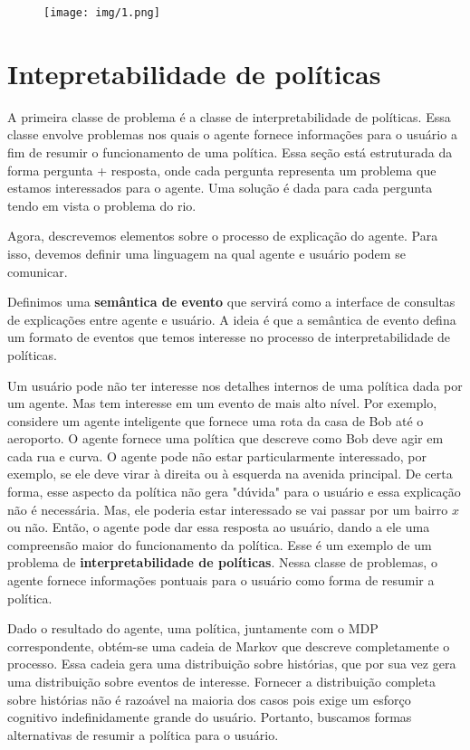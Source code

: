 \documentclass{article}
\begin{document}
\begin{figure}[h]
  \begin{center}
    \texttt{[image: img/1.png]}
  \end{center}
  \caption{}
  \label{fig:}
\end{figure}


\section{Intepretabilidade de políticas}
A primeira classe de problema é a classe de interpretabilidade de políticas. Essa classe envolve problemas nos quais o agente fornece informações para o usuário a fim de resumir o funcionamento de uma política. Essa seção está estruturada da forma pergunta + resposta, onde cada pergunta representa um problema que estamos interessados para o agente. Uma solução é dada para cada pergunta tendo em vista o problema do rio.

Agora, descrevemos elementos sobre o processo de explicação do agente. Para isso, devemos definir uma linguagem na qual agente e usuário podem se comunicar. 

Definimos uma \textbf{semântica de evento} que servirá como a interface de consultas de explicações entre agente e usuário. A ideia é que a semântica de evento defina um formato de eventos que temos interesse no processo de interpretabilidade de políticas.  

Um usuário pode não ter interesse nos detalhes internos de uma política dada por um agente. Mas tem interesse em um evento de mais alto nível. Por exemplo, considere um agente inteligente que fornece uma rota da casa de Bob até o aeroporto. O agente fornece uma política que descreve como Bob deve agir em cada rua e curva. O agente pode não estar particularmente interessado, por exemplo, se ele deve virar à direita ou à esquerda na avenida principal. De certa forma, esse aspecto da política não gera "dúvida" para o usuário e essa explicação não é necessária. Mas, ele poderia estar interessado se vai passar por um bairro $x$ ou não. Então, o agente pode dar essa resposta ao usuário, dando a ele uma compreensão maior do funcionamento da política. Esse é um exemplo de um problema de \textbf{interpretabilidade de políticas}. Nessa classe de problemas, o agente fornece informações pontuais para o usuário como forma de resumir a política. 

Dado o resultado do agente, uma política, juntamente com o MDP correspondente, obtém-se uma cadeia de Markov que descreve completamente o processo. Essa cadeia gera uma distribuição sobre histórias, que por sua vez gera uma distribuição sobre eventos de interesse. Fornecer a distribuição completa sobre histórias não é razoável na maioria dos casos pois exige um esforço cognitivo indefinidamente grande do usuário. Portanto, buscamos formas alternativas de resumir a política para o usuário.
\end{document}
